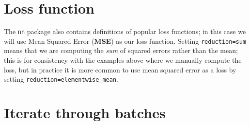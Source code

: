 \documentclass[]{book}
\newenvironment{Shaded}{\begin{snugshade}}{\end{snugshade}}
\newcommand{\DataTypeTok}[1]{\textcolor[rgb]{0.13,0.29,0.53}{#1}}
\newcommand{\KeywordTok}[1]{\textcolor[rgb]{0.13,0.29,0.53}{\textbf{#1}}}
\newcommand{\NormalTok}[1]{#1}
\newcommand{\OperatorTok}[1]{\textcolor[rgb]{0.81,0.36,0.00}{\textbf{#1}}}
\newcommand{\StringTok}[1]{\textcolor[rgb]{0.31,0.60,0.02}{#1}}
\begin{document}
\hypertarget{loss-function-1}{%
\section{Loss function}\label{loss-function-1}}

The \texttt{nn} package also contains definitions of popular loss functions; in this case we will use Mean Squared Error (\textbf{MSE}) as our loss function. Setting \texttt{reduction=\textquotesingle{}sum\textquotesingle{}} means that we are computing the \emph{sum} of squared errors rather than the mean; this is for consistency with the examples above where we manually compute the loss, but in practice it is more common to use mean squared error as a loss by setting \texttt{reduction=\textquotesingle{}elementwise\_mean\textquotesingle{}}.

\begin{Shaded}
\end{Shaded}

\hypertarget{iterate-through-batches}{%
\section{Iterate through batches}\label{iterate-through-batches}}
\end{document}
